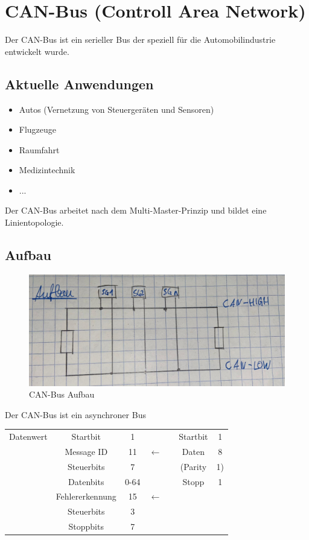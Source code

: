 



\section{CAN-Bus (Controll Area Network)}
Der CAN-Bus ist ein serieller Bus der speziell für die Automobilindustrie entwickelt wurde.

\subsection*{Aktuelle Anwendungen}
\begin{itemize}
	\item Autos (Vernetzung von Steuergeräten und Sensoren)
	\item Flugzeuge
	\item Raumfahrt
	\item Medizintechnik
	\item ...
\end{itemize}
Der CAN-Bus arbeitet nach dem Multi-Master-Prinzip und bildet eine Linientopologie.

\subsection*{Aufbau}
\begin{figure}[H]
	\centering
	\includegraphics[width=0.8\linewidth]{figures/canbus.jpeg}
	\caption{CAN-Bus Aufbau}
\end{figure}
Der CAN-Bus ist ein asynchroner Bus \\

\begin{tabular}{ccccccc}
	Datenwert & Startbit & 1 & \checkmark && Startbit & 1 \\
	& Message ID & 11 & $\leftarrow$ && Daten & 8 \\
	& Steuerbits & 7 & \checkmark && (Parity & 1) \\
	& Datenbits & 0-64 & \checkmark && Stopp & 1 \\
	& Fehlererkennung & 15 & $\leftarrow$ &&  &  \\
	& Steuerbits & 3 & \checkmark &&  &  \\
	& Stoppbits & 7 & \checkmark &&  &  \\
\end{tabular}

